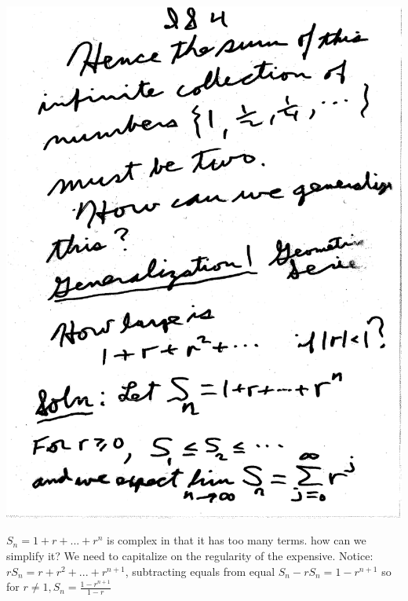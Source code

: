 \documentclass[10pt,a4paper]{article}
\begin{document}
\includegraphics[scale=.5]{Pages/IS_4}

\newpage

$S_{n}=1+r+...+r^{n}$ is complex in that it has too many terms. how can we simplify it? We need to capitalize on the regularity of the expensive. 
Notice: $rS_{n}=r+r^{2}+...+r^{n+1}$, subtracting equals from equal $S_{n}-rS_{n}=1-r^{n+1}$ so for $r\neq 1, S_{n}=\frac{1-r^{n+1}}{1-r}$
\end{document}
